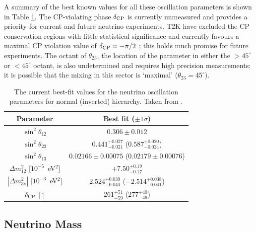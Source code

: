 A summary of the best known values for all these oscillation parameters is shown in Table \ref{tab:OscillationParameters}.  The CP-violating phase $\delta_{\textnormal{CP}}$ is currently unmeasured and provides a priority for current and future neutrino experiments.  T2K have excluded the CP conservation regions with little statistical significance and currently favours a maximal CP violation value of $\delta_{\textnormal{CP}} = -\pi/2$ \cite{T2K2017}; this holds much promise for future experiments.  The octant of $\theta_{23}$, the location of the parameter in either the $> 45^{\circ}$ or $< 45^{\circ}$ octant, is also undetermined and requires high precision measurements; it is possible that the mixing in this sector is `maximal' ($\theta_{23} = 45^{\circ}$).

\begin{table}
  \caption[The current best-fit values for the neutrino oscillation parameters for normal and hierarchies.]{The current best-fit values for the neutrino oscillation parameters for normal (inverted) hierarchy.  Taken from \cite{NuFit2017}.}
  \label{tab:OscillationParameters}
  \centering
    \begin{tabular}{c c}
      \toprule
      Parameter & Best fit ($\pm 1\sigma$) \\
      \midrule
      $\sin^2{\theta_{12}}$ & $0.306\pm0.012$ \\
      $\sin^2{\theta_{23}}$ & $0.441^{+0.027}_{-0.021}$ ($0.587^{+0.020}_{-0.024}$) \\
      $\sin^2{\theta_{13}}$ & $0.02166\pm0.00075$ ($0.02179\pm0.00076$) \\
      \midrule
      $\Delta m_{12}^2$ [$10^{-5}$~eV$^2$]     & $+7.50^{+0.19}_{-0.17}$ \\
      $|\Delta m_{3\nu}^2|$ [$10^{-3}$~eV$^2$] & $2.524^{+0.039}_{-0.040}$ ($-2.514^{+0.038}_{-0.041}$) \\
      \midrule
      $\delta_{\textnormal{CP}}$ [$^{\circ}$] & $261^{+51}_{-59}$ ($277^{+40}_{-46}$) \\
      \bottomrule
    \end{tabular}
\end{table}

\subsection{Neutrino Mass}\label{sec:NeutrinoMass}

